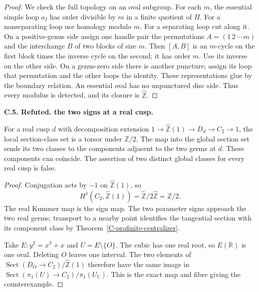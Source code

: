 \documentclass[11pt,oneside]{article}
\makeatletter
\newcounter{statementanchor}
\newenvironment{statement}[3]{%
 \refstepcounter{statementanchor}\def\@currentlabel{#1}%
 \par\addvspace{9pt}\noindent
 \textbf{#1. #2. #3.}\par\nobreak\noindent\ignorespaces
}{\par\addvspace{5pt}}
\makeatother
\begin{document}
\begin{proof}
We check the full topology on an oval subgroup.
For each $m$, the essential simple loop $a_I$
has order divisible by $m$ in a finite quotient of $\Pi$.
For a nonseparating loop use homology modulo $m$.
For a separating loop cut along it. On a positive-genus
side assign one handle pair the permutations
$A=(1\,2\,\cdots\,m)$ and the interchange $B$ of
two blocks of size $m$. Then $[A,B]$ is an
$m$-cycle on the first block times the inverse cycle
on the second; it has order $m$. Use its inverse
on the other side. On a genus-zero side there is
another puncture; assign its loop that permutation
and the other loops the identity. These representations
glue by the boundary relation. An essential oval
has no unpunctured disc side. Thus every modulus
is detected, and its closure is $\widehat{\mathbb Z}$.
\end{proof}

\begin{statement}{C.5}{Refuted}{the two signs at a real cusp}
\label{st:C.5}
\label{C-cusp-packet}
For a real cusp $d$ with decomposition extension
$1\to\widehat{\mathbb Z}(1)\to D_d\to C_2\to1$,
the local section-class set is a torsor under
$\mathbb Z/2$. The map into the global section set
sends its two classes to the components adjacent
to the two germs at $d$. These components can coincide.
The assertion of two distinct global classes for
every real cusp is false.
\end{statement}
\begin{proof}
Conjugation acts by $-1$ on $\widehat{\mathbb Z}(1)$, so
\[
 H^1(C_2,\widehat{\mathbb Z}(1))
 =\widehat{\mathbb Z}/2\widehat{\mathbb Z}=\mathbb Z/2.
\]
The real Kummer map is the sign map. The two parameter
signs approach the two real germs; transport to a nearby
point identifies the tangential section with its component
class by Theorem~\ref{C-profinite-centralizer}.

Take $E:y^2=x^3+x$ and $U=E\setminus\{O\}$.
The cubic has one real root, so $E(\mathbb R)$ is one
oval. Deleting $O$ leaves one interval. The two
elements of $\operatorname{Sect}(D_O\to C_2)/
\widehat{\mathbb Z}(1)$ therefore have the same
image in $\operatorname{Sect}(\pi_1(U)\to C_2)/
\pi_1(U_{\mathbb C})$. This is the exact map and
fibre giving the counterexample.
\end{proof}
\end{document}
